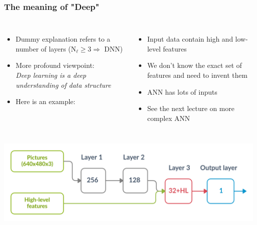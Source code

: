 \documentclass[12pt, aspectratio = 169]{beamer}
\begin{document}

\begin{frame}[t]
	\frametitle{The meaning of "Deep"}
	\begin{columns}[T]
		\begin{minipage}[T]{\linewidth}
			\begin{itemize}
				\item Dummy explanation refers to a number of layers ($\text{N}_{\ell} \geq 3 \Rightarrow$ DNN)
				\item More profound viewpoint:\\
				\textit{Deep learning is a deep understanding of data structure}
				\item Here is an example:
			\end{itemize}
		\end{minipage}%
		\begin{minipage}[T]{\linewidth}
			\centering
			\begin{itemize}
				\item Input data contain high and low-level features
				\onslide<4->\item We don't know the exact set of features and need to invent them
				\onslide<5->\item ANN has lots of inputs 
				\onslide<6->\item \color{blue} See the next lecture on more complex ANN \color{black}
			\end{itemize}
		\end{minipage}
	\end{columns}
 \centering \includegraphics[width=0.7\linewidth]{DNN_example}
\end{frame}

\end{document}
